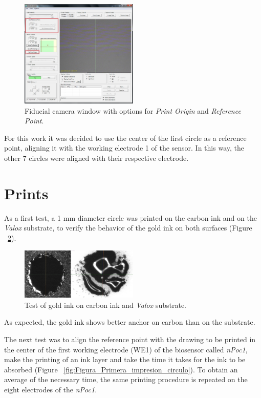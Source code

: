 \begin{figure}[H]
  \centering
    \includegraphics[width=0.5\textwidth]{Figures/Figura_Ventana_Camara_Fiducial}
  \caption{Fiducial camera window with options for \textit{Print Origin} and \textit{Reference Point}.}
  \label{fig:Figura_Ventana_Camara_Fiducial}
\end{figure}

For this work it was decided to use the center of the first circle as a reference point, aligning it with the working electrode 1 of the sensor. In this way, the other 7 circles were aligned with their respective electrode.

\section{Prints}
As a first test, a 1 mm diameter circle was printed on the carbon ink and on the \textit{Valox} substrate, to verify the behavior of the gold ink on both surfaces (Figure ~\ref{fig:Figura_Prueba_Sobre_Sustratos}).

\begin{figure}[H]
  \centering
    \includegraphics[width=0.5\textwidth]{Figures/Figura_Prueba_Sobre_Sustratos}
  \caption{Test of gold ink on carbon ink and \textit{Valox} substrate.}
  \label{fig:Figura_Prueba_Sobre_Sustratos}
\end{figure}

As expected, the gold ink shows better anchor on carbon than on the substrate.

The next test was to align the reference point with the drawing to be printed in the center of the first working electrode (WE1) of the biosensor called \textit{nPoc1}, make the printing of an ink layer and take the time it takes for the ink to be absorbed (Figure ~\ref{fig:Figura_Primera_impresion_circulo}). To obtain an average of the necessary time, the same printing procedure is repeated on the eight electrodes of the \textit{nPoc1}.


